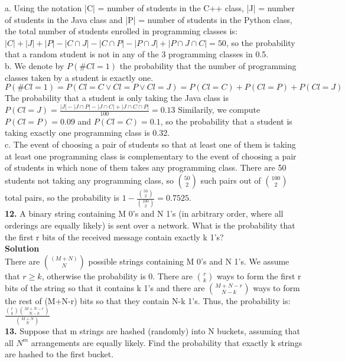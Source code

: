 \documentclass[10pt,a4paper,oneside,draft]{report}
\begin{document}
a. Using the notation |C| = number of students in the C++ class, |J| = number of students in the Java class and |P| = number of students in the Python class, the total number of students enrolled in programming classes is: $|C| + |J| + |P| - |C \cap J| - |C \cap P| - |P \cap J| + |P \cap J \cap C| = 50$, so the probability that a random student is not in any of the 3 programming classes in 0.5. \\ 

b. We denote by $P(\#Cl=1)$ the probability that the number of programming classes taken by a student is exactly one.
$P(\#Cl=1) = P(Cl=C \lor Cl=P \lor Cl=J) = P(Cl=C) + P(Cl=P) + P(Cl=J)$ \\
The probability that a student is only taking the Java class is $P(Cl=J) = \frac{|J| - |J \cap P| - |J \cap C| + |J \cap C \cap P|}{100} = 0.13$
Similarily, we compute $P(Cl=P)=0.09$ and $P(Cl=C)=0.1$, so the probability that a student is taking exactly one programming class is 0.32.\\

c. The event of choosing a pair of students so that at least one of them is taking at least one programming class is complementary to the event of choosing a pair of students in which none of them takes any programming class. There are 50 students not taking any programming class, so $50 \choose 2$ such pairs out of $100 \choose 2$ total pairs, so the probability is $1 - \frac{ {50\choose 2} }{ {100 \choose 2} } = 0.7525.$ \\

\textbf{12.} A binary string containing M 0's and N 1's (in arbitrary order, where all orderings are equally likely) is sent over a network. What is the probability that the first r bits of the received message contain exactly k 1's? \\

\textbf{Solution} \\

There are $(M+N) \choose N$ possible strings containing M 0's and N 1's. We assume that $r \geq k$, otherwise the probability is 0. There are $r \choose k$ ways to form the first r bits of the string so that it contains k 1's and there are ${M+N-r} \choose {N-k}$ ways to form the rest of (M+N-r) bits so that they contain N-k 1's. Thus, the probability is: \\
$\frac{ {r \choose k} {{M+N-r} \choose {N-k}} }{ {{M+N} \choose N} }$ \\


\textbf{13.} Suppose that m strings are hashed (randomly) into N buckets, assuming that all $N^m$ arrangements are equally likely. Find the probability that exactly k strings are hashed to the first bucket. \\
\end{document}
